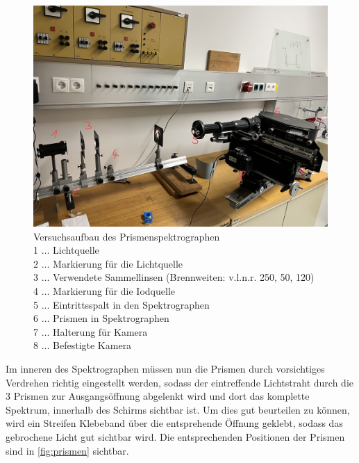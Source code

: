 \documentclass[12pt,english,ngerman]{scrartcl}
\begin{document}
\begin{figure}[H]
	\begin{center}
		\includegraphics[width =\textwidth]{./figures/Spektograph.png}
	\end{center}
	\caption[Versuchsaufbau des Prismenspektrographen] {Versuchsaufbau des
		Prismenspektrographen                                                    \\
		1 \(\dots\) Lichtquelle                                                  \\
		2 \(\dots\) Markierung für die Lichtquelle                               \\
		3 \(\dots\) Verwendete Sammellinsen (Brennweiten: v.l.n.r. 250, 50, 120) \\
		4 \(\dots\) Markierung für die Iodquelle                                 \\
		5 \(\dots\) Eintrittsspalt in den Spektrographen                         \\
		6 \(\dots\) Prismen in Spektrographen                                    \\
		7 \(\dots\) Halterung für Kamera                                         \\
		8 \(\dots\) Befestigte Kamera
	}\label{fig:aufbau_Spektograph}
\end{figure}

Im inneren des Spektrographen müssen nun die Prismen durch vorsichtiges
Verdrehen richtig eingestellt werden, sodass der eintreffende Lichtstraht durch
die 3 Prismen zur Ausgangsöffnung abgelenkt wird und dort das komplette
Spektrum, innerhalb des Schirms sichtbar ist. Um dies gut beurteilen zu können,
wird ein Streifen Klebeband über die entsprehende Öffnung geklebt, sodass das
gebrochene Licht gut sichtbar wird. Die entsprechenden Positionen der Prismen
sind in \autoref{fig:prismen} sichtbar.
\end{document}
